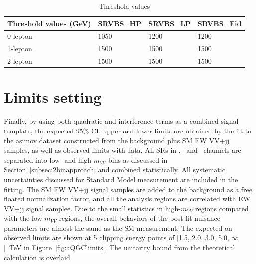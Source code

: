 \begin{table}[ht!]
\small
\begin{center}
\begin{tabular}{ | l || l | l | l |}
\hline
Threshold values (GeV)          & SRVBS\_HP  & SRVBS\_LP & SRVBS\_Fid  \tabularnewline \hline
0-lepton & 1050      & 1200     & 1200       \tabularnewline \hline
1-lepton & 1500      & 1500     & 1500       \tabularnewline \hline
2-lepton & 1500      & 1500     & 1500       \tabularnewline \hline
\end{tabular}
\caption{Threshold values}
\label{tab:2binthreshold}
\end{center}
\end{table}

\section{Limits setting}
Finally, by using both quadratic and interference terms as a combined signal template, the expected 95\% CL upper and lower limits are obtained by the fit to the asimov dataset constructed from the background plus SM EW VV+jj samples, as well as observed limits with data.
All SRs in \zlep, \olep\, and \tlep\ channels are separated into low- and high-$m_{VV}$ bins as discussed in Section~\ref{subsec:2binapproach} and combined statistically.
All systematic uncertainties discussed for Standard Model measurement are included in the fitting.
The SM EW VV+jj signal samples are added to the background as a free floated normalization factor, and all the analysis regions are correlated with EW VV+jj signal samplee.
Due to the small statistics in high-$m_{VV}$ regions compared with the low-$m_{VV}$ regions, the overall behaviors of the post-fit nuisance parameters are almost the same as the SM measurement.
The expected on observed limits are shown at 5 clipping energy points of [1.5, 2.0, 3.0, 5.0, $\infty$]~TeV in Figure~\ref{fig:aQGClimits}.
The unitarity bound from the theoretical calculation \cite{PhysRevD.101.113003} is overlaid.

